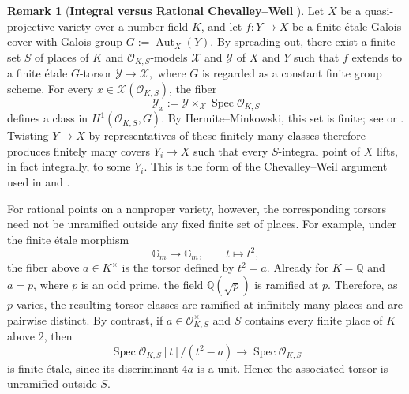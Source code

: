 \documentclass[12 pt]{amsart}
\theoremstyle{definition}
\newtheorem{Remark}[theorem]{Remark}
\begin{document}
\begin{Remark}[\textbf{Integral versus Rational Chevalley--Weil
}]\label{Chevalley--Weil}
Let \(X\) be a quasi-projective variety over a number field \(K\), and
let \(f\colon Y\to X\) be a finite \'etale Galois cover with Galois
group
\(
G:=\operatorname{Aut}_X(Y).
\)
By spreading out, there exist a finite set \(S\) of places of \(K\) and
\(\mathcal O_{K,S}\)-models \(\mathcal X\) and \(\mathcal Y\) of \(X\)
and \(Y\) such that \(f\) extends to a finite \'etale \(G\)-torsor
\(
\mathcal Y\to\mathcal X,
\)
where \(G\) is regarded as a constant finite group scheme. For every
\(x\in\mathcal X(\mathcal O_{K,S})\), the fiber
\[
\mathcal Y_x:=
\mathcal Y\times_{\mathcal X}\operatorname{Spec}\mathcal O_{K,S}
\]
defines a class in \(H^1(\mathcal O_{K,S},G)\). By
Hermite--Minkowski, this set is finite; see
\cite[Proposition~4.6]{brunebarbe2022counting} or
\cite[Proof of Claim~2]{ellenberg2023sparsity}. Twisting \(Y\to X\)
by representatives of these finitely many classes therefore produces
finitely many covers \(Y_i\to X\) such that every \(S\)-integral point
of \(X\) lifts, in fact integrally, to some \(Y_i\). This is the form
of the Chevalley--Weil argument used in
\cite[\S 3]{ellenberg2023sparsity} and
\cite[Proposition~4.12]{brunebarbe2022counting}.

For rational points on a nonproper variety, however, the corresponding
torsors need not be unramified outside any fixed finite set of places.
For example, under the finite \'etale morphism
\[
\mathbb G_m\longrightarrow\mathbb G_m,\qquad t\longmapsto t^2,
\]
the fiber above \(a\in K^\times\) is the torsor defined by \(t^2=a\).
Already for \(K=\mathbb Q\) and \(a=p\), where \(p\) is an odd prime,
the field \(\mathbb Q(\sqrt p)\) is ramified at \(p\). Therefore, as \(p\)
varies, the resulting torsor classes are ramified at infinitely many
places and are pairwise distinct. By contrast, if
\(a\in\mathcal O_{K,S}^{\times}\) and \(S\) contains every finite place
of \(K\) above \(2\), then
\[
\operatorname{Spec}\mathcal O_{K,S}[t]/(t^2-a)
\longrightarrow\operatorname{Spec}\mathcal O_{K,S}
\]
is finite \'etale, since its discriminant \(4a\) is a unit. Hence the
associated torsor is unramified outside \(S\).
\end{Remark}







\end{document}
